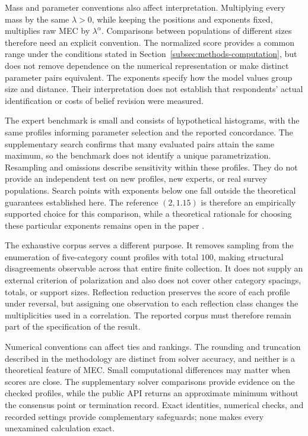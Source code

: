 \documentclass{article}
\theoremstyle{plain}
\theoremstyle{remark}
\begin{document}
Mass and parameter conventions also affect interpretation. Multiplying every mass by the same $\lambda>0$, while keeping the positions and exponents fixed, multiplies raw MEC by $\lambda^\alpha$. Comparisons between populations of different sizes therefore need an explicit convention. The normalized score provides a common range under the conditions stated in Section~\ref{subsec:methods-computation}, but does not remove dependence on the numerical representation or make distinct parameter pairs equivalent. The exponents specify how the model values group size and distance. Their interpretation does not establish that respondents' actual identification or costs of belief revision were measured.

The expert benchmark is small and consists of hypothetical histograms, with the same profiles informing parameter selection and the reported concordance. The supplementary search confirms that many evaluated pairs attain the same maximum, so the benchmark does not identify a unique parametrization. Resampling and omissions describe sensitivity within these profiles. They do not provide an independent test on new profiles, new experts, or real survey populations. Search points with exponents below one fall outside the theoretical guarantees established here. The reference $(2,1.15)$ is therefore an empirically supported choice for this comparison, while a theoretical rationale for choosing these particular exponents remains open in the paper \citep{aranda2026mec}.

The exhaustive corpus serves a different purpose. It removes sampling from the enumeration of five-category count profiles with total $100$, making structural disagreements observable across that entire finite collection. It does not supply an external criterion of polarization and also does not cover other category spacings, totals, or support sizes. Reflection reduction preserves the score of each profile under reversal, but assigning one observation to each reflection class changes the multiplicities used in a correlation. The reported corpus must therefore remain part of the specification of the result.

Numerical conventions can affect ties and rankings. The rounding and truncation described in the methodology are distinct from solver accuracy, and neither is a theoretical feature of MEC. Small computational differences may matter when scores are close. The supplementary solver comparisons provide evidence on the checked profiles, while the public API returns an approximate minimum without the consensus point or termination record. Exact identities, numerical checks, and recorded settings provide complementary safeguards; none makes every unexamined calculation exact.
\end{document}
